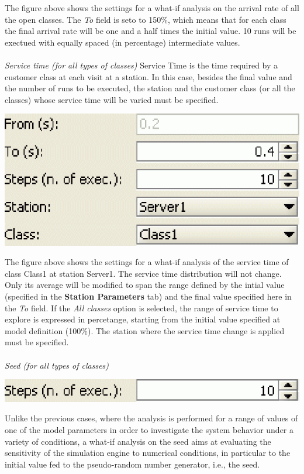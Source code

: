 \begin{description*}
\begin{center}
\end{center}
The figure above shows the settings for a what-if analysis on the arrival rate of all the open classes. The \emph{To} field is seto to 150\%, which means that for each class the final arrival rate will be one and a half times the initial value. 10 runs will be exectued with equally spaced (in percentage) intermediate values.\\\\
\textit{Service time (for all types of classes)}
Service Time is the time required by a customer class at each visit at a station. In this case, besides the final value and the number of runs to be executed, the station and the customer class (or all the classes) whose service time will be varied must be specified.
\begin{center}
\includegraphics[scale=.5]{img/jsim/ex2_service_time.eps}
\end{center}
The figure above shows the settings for a what-if analysis of the service time of class Class1 at station Server1. The service time distribution will not change. Only its average will be modified to span the range defined by the intial value (specified in the \textbf{Station Parameters} tab) and the final value specified here in
the \emph{To} field.
If the \emph{All classes} option is selected, the range of service time to explore is expressed in percetange, starting from the initial value specified at model definition (100\%). The station where the service time change is applied must be specified.\\\\
\textit{Seed (for all types of classes)}
\begin{center}
\includegraphics[scale=.5]{img/jsim/sedd.eps}
\end{center}
Unlike the previous cases, where the analysis is performed for a range of values of one of the model parameters in order to investigate the system behavior under a variety of conditions, a what-if analysis on the seed aims at evaluating the sensitivity of the simulation engine to numerical conditions, in particular to the initial value fed to the pseudo-random number generator, i.e., the seed.

\end{description*}
